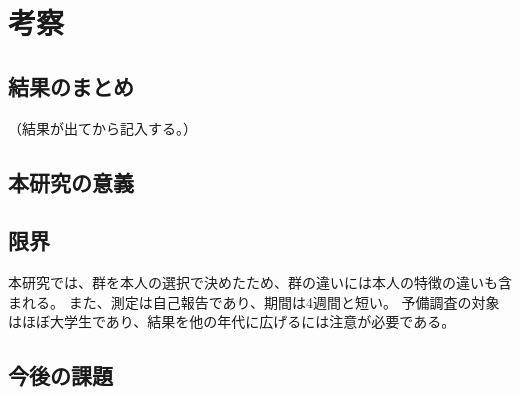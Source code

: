 \chapter{考察}
\section{結果のまとめ}
（結果が出てから記入する。）
\section{本研究の意義}
\section{限界}
本研究では、群を本人の選択で決めたため、群の違いには本人の特徴の違いも含まれる。
また、測定は自己報告であり、期間は4週間と短い。
予備調査の対象はほぼ大学生であり、結果を他の年代に広げるには注意が必要である。
\section{今後の課題}

